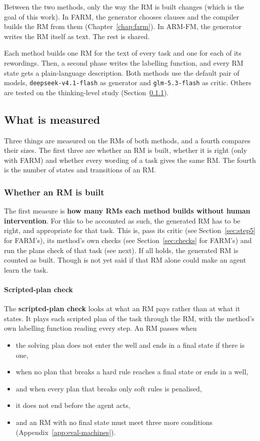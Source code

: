 \documentclass[11pt,english,listoffigures,listoftables]{tfgetsinf}
\begin{document}
Between the two methods, only the way the RM is built changes (which is the goal of this work). In FARM, the generator chooses clauses and the compiler builds the RM from them (Chapter~\ref{chap:farm}). In ARM-FM, the generator writes the RM itself as text. The rest is shared. 

Each method builds one RM for the text of every task and one for each of its rewordings. Then, a second phase writes the labelling function, and every RM state gets a plain-language description. Both methods use the default pair of models, \texttt{deepseek-v4.1-flash} as generator and \texttt{glm-5.3-flash} as critic. Others are tested on the thinking-level study (Section~\ref{sec:eval-built}).


\subsection{What is measured}
Three things are measured on the RMs of both methods, and a fourth compares their sizes. The first three are whether an RM is built, whether it is right (only with FARM) and whether every wording of a task gives the same RM. The fourth is the number of states and transitions of an RM.


\subsubsection{Whether an RM is built}
\label{sec:eval-built}The first measure is \textbf{how many RMs each method builds without human intervention}. For this to be accounted as such, the generated RM has to be right, and appropriate for that task. This is, pass its critic (see Section~\ref{sec:step5} for FARM's), its method's own checks (see Section~\ref{sec:checks} for FARM's) and run the plans check of that task (see next). If all holds, the generated RM is counted as built. Though is not yet said if that RM alone could make an agent learn the task.

\label{sec:eval-plan-check}\paragraph{Scripted-plan check} The \textbf{scripted-plan check} looks at what an RM pays rather than at what it states. It plays each scripted plan of the task through the RM, with the method's own labelling function reading every step. An RM passes when 
\begin{itemize}
    \item the solving plan does not enter the well and ends in a final state if there is one,
    \item when no plan that breaks a hard rule reaches a final state or ends in a well,
    \item and when every plan that breaks only soft rules is penalised,
    \item it does not end before the agent acts,
    \item and an RM with no final state must meet three more conditions (Appendix~\ref{app:eval-machines}).
\end{itemize}
\end{document}
